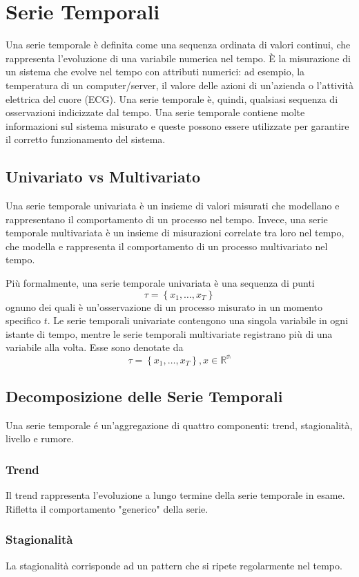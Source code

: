\section{Serie Temporali}
Una serie temporale è definita come una sequenza ordinata di valori continui, che rappresenta l'evoluzione di una variabile numerica nel tempo. È la misurazione di un sistema che evolve nel tempo con attributi numerici: ad esempio, la temperatura di un computer/server, il valore delle azioni di un'azienda o l'attività elettrica del cuore (ECG). Una serie temporale è, quindi, qualsiasi sequenza di osservazioni indicizzate dal tempo. Una serie temporale contiene molte informazioni sul sistema misurato e queste possono essere utilizzate per garantire il corretto funzionamento del sistema.

\subsection{Univariato vs Multivariato}
Una serie temporale univariata è un insieme di valori misurati che modellano e rappresentano il comportamento di un processo nel tempo. Invece, una serie temporale multivariata è un insieme di misurazioni correlate tra loro nel tempo, che modella e rappresenta il comportamento di un processo multivariato nel tempo. 

Più formalmente, una serie temporale univariata è una sequenza di punti
\[\tau = \left\{ x_1, \ldots, x_T  \right\}\]
ognuno dei quali è un'osservazione di un processo misurato in un momento specifico $t$. Le serie temporali univariate contengono una singola variabile in ogni istante di tempo, mentre le serie temporali multivariate registrano più di una variabile alla volta. Esse sono denotate da
\[\tau = \left\{ x_1, \ldots, x_T  \right\}, x \in \mathbb{R^n} \]

\subsection{Decomposizione delle Serie Temporali}
Una serie temporale é un'aggregazione di quattro componenti: trend, stagionalità, livello e rumore.

\subsubsection{Trend}
Il trend rappresenta l'evoluzione a lungo termine della serie temporale in esame. Rifletta il comportamento "generico" della serie.

\subsubsection{Stagionalità}
La stagionalità corrisponde ad un pattern che si ripete regolarmente nel tempo.

